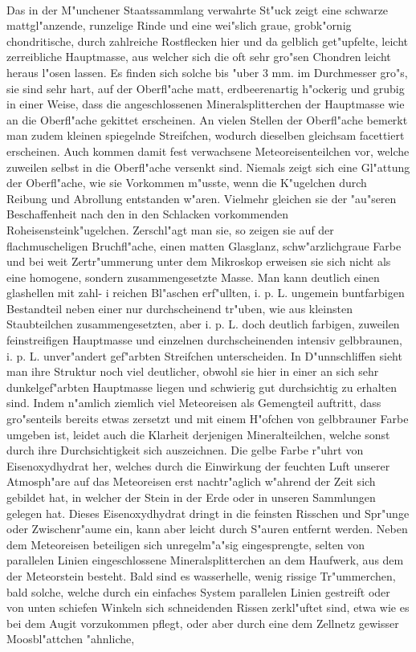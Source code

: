 \documentclass[a4paper, 11pt, oneside]{article}
\begin{document}
\paragraph{}
Das in der M"unchener Staatssammlang verwahrte St"uck zeigt eine schwarze mattgl"anzende, runzelige Rinde und eine wei"slich graue, grobk"ornig chondritische, durch zahlreiche Rostflecken hier und da gelblich get"upfelte, leicht zerreibliche Hauptmasse, aus welcher sich die oft sehr gro"sen Chondren leicht heraus l"osen lassen. Es finden sich solche bis "uber 3 mm. im Durchmesser gro"s, sie sind sehr hart, auf der Oberfl"ache matt, erdbeerenartig h"ockerig und grubig in einer Weise, dass die angeschlossenen Mineralsplitterchen der Hauptmasse wie an die Oberfl"ache gekittet erscheinen. An vielen Stellen der Oberfl"ache bemerkt man zudem kleinen spiegelnde Streifchen, wodurch dieselben gleichsam facettiert erscheinen. Auch kommen damit fest verwachsene Meteoreisenteilchen vor, welche zuweilen selbst in die Oberfl"ache versenkt sind. Niemals zeigt sich eine Gl"attung der Oberfl"ache, wie sie Vorkommen m"usste, wenn die K"ugelchen durch Reibung und Abrollung entstanden w"aren. Vielmehr gleichen sie der "au"seren Beschaffenheit nach den in den Schlacken vorkommenden Roheisensteink"ugelchen. Zerschl"agt man sie, so zeigen sie auf der flachmuscheligen Bruchfl"ache, einen matten Glasglanz, schw"arzlichgraue Farbe und bei weit Zertr"ummerung unter dem Mikroskop erweisen sie sich nicht als eine homogene, sondern zusammengesetzte Masse. Man kann deutlich einen glashellen mit zahl- i reichen Bl"aschen erf"ullten, i. p. L. ungemein buntfarbigen Bestandteil neben einer nur durchscheinend tr"uben, wie aus kleinsten Staubteilchen zusammengesetzten, aber i. p. L. doch deutlich farbigen, zuweilen feinstreifigen Hauptmasse und einzelnen durchscheinenden intensiv gelbbraunen, i. p. L. unver"andert gef"arbten Streifchen unterscheiden. In D"unnschliffen sieht man ihre Struktur noch viel deutlicher, obwohl sie hier in einer an sich sehr dunkelgef"arbten Hauptmasse liegen und schwierig gut durchsichtig zu erhalten sind. Indem n"amlich ziemlich viel Meteoreisen als Gemengteil auftritt, dass gro"senteils bereits etwas zersetzt und mit einem H"ofchen von gelbbrauner Farbe umgeben ist, leidet auch die Klarheit derjenigen Mineralteilchen, welche sonst durch ihre Durchsichtigkeit sich auszeichnen. Die gelbe Farbe r"uhrt von Eisenoxydhydrat her, welches durch die Einwirkung der feuchten Luft unserer Atmosph"are auf das Meteoreisen erst nachtr"aglich w"ahrend der Zeit sich gebildet hat, in welcher der Stein in der Erde oder in unseren Sammlungen gelegen hat. Dieses Eisenoxydhydrat dringt in die feinsten Risschen und Spr"unge oder Zwischenr"aume ein, kann aber leicht durch S"auren entfernt werden. Neben dem Meteoreisen beteiligen sich unregelm"a"sig eingesprengte, selten von parallelen Linien eingeschlossene Mineralsplitterchen an dem Haufwerk, aus dem der Meteorstein besteht. Bald sind es wasserhelle, wenig rissige Tr"ummerchen, bald solche, welche durch ein einfaches System parallelen Linien gestreift oder von unten schiefen Winkeln sich schneidenden Rissen zerkl"uftet sind, etwa wie es bei dem Augit vorzukommen pflegt, oder aber durch eine dem Zellnetz gewisser Moosbl"attchen "ahnliche, 
\end{document}
